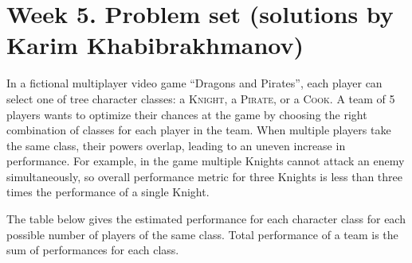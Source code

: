 \documentclass[dvipsnames]{article}
\begin{document}
\section*{Week 5. Problem set (solutions by Karim Khabibrakhmanov)}

\thispagestyle{fancy}

In a fictional multiplayer video game ``Dragons and Pirates'', each player can select one of tree character classes:
  a \textsc{Knight}, a \textsc{Pirate}, or a \textsc{Cook}. A team of 5 players wants to optimize their chances at the game
  by choosing the right combination of classes for each player in the team. When multiple players take the same class,
  their powers overlap, leading to an uneven increase in performance. For example, in the game multiple Knights cannot attack an enemy simultaneously,
  so overall performance metric for three Knights is less than three times the performance of a single Knight.
  
  The table below gives the estimated performance for each character class for each possible number of players of the same class.
  Total performance of a team is the sum of performances for each class.
  
\end{document}
